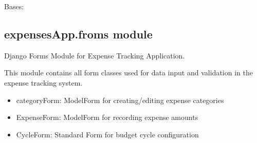 \documentclass[letterpaper,10pt,english]{sphinxmanual}
\begin{document}
\begin{fulllineitems}
\label{\detokenize{expensesApp:expensesApp.apps.ExpensesappConfig}}
\pysigstartsignatures
\pysiglinewithargsret
{}
{\sphinxparamcomma {}}
{}
\pysigstopsignatures
\sphinxAtStartPar
Bases: 

\begin{fulllineitems}
\label{\detokenize{expensesApp:expensesApp.apps.ExpensesappConfig.name}}
\pysigstartsignatures
\pysigline
{}
\pysigstopsignatures
\end{fulllineitems}


\end{fulllineitems}



\subsection{expensesApp.froms module}
\label{\detokenize{expensesApp:module-expensesApp.froms}}\label{\detokenize{expensesApp:expensesapp-froms-module}}
\sphinxAtStartPar
Django Forms Module for Expense Tracking Application.

\sphinxAtStartPar
This module contains all form classes used for data input and validation
in the expense tracking system.
\begin{description}
\begin{itemize}
\item {} 
\sphinxAtStartPar
categoryForm: ModelForm for creating/editing expense categories

\item {} 
\sphinxAtStartPar
ExpenseForm: ModelForm for recording expense amounts

\item {} 
\sphinxAtStartPar
CycleForm: Standard Form for budget cycle configuration

\end{itemize}

\end{description}
\end{document}
